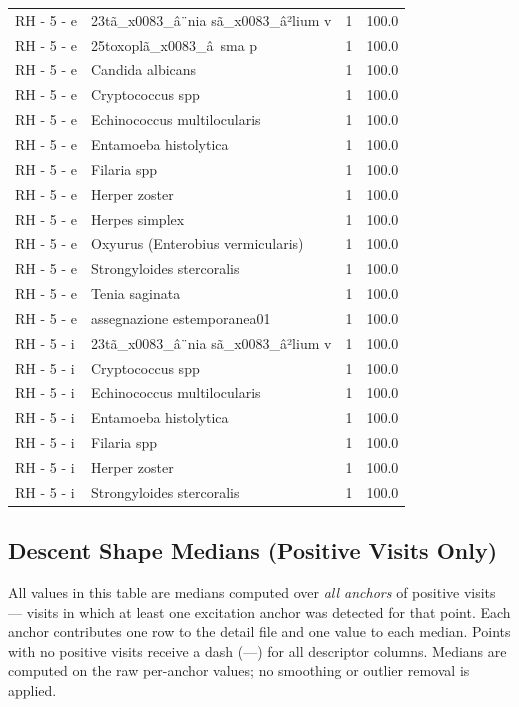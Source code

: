 \documentclass[a4paper,11pt]{article}
\begin{document}
\begin{footnotesize}
\begin{longtable}{p{3.5cm}p{7.5cm}rr}
RH - 5 - e & 23tã\_x0083\_â¨nia sã\_x0083\_â²lium v & 1 & 100.0 \\
RH - 5 - e & 25toxoplã\_x0083\_â sma p & 1 & 100.0 \\
RH - 5 - e & Candida albicans & 1 & 100.0 \\
RH - 5 - e & Cryptococcus spp & 1 & 100.0 \\
RH - 5 - e & Echinococcus multilocularis & 1 & 100.0 \\
RH - 5 - e & Entamoeba histolytica & 1 & 100.0 \\
RH - 5 - e & Filaria spp & 1 & 100.0 \\
RH - 5 - e & Herper zoster & 1 & 100.0 \\
RH - 5 - e & Herpes simplex & 1 & 100.0 \\
RH - 5 - e & Oxyurus (Enterobius vermicularis) & 1 & 100.0 \\
RH - 5 - e & Strongyloides stercoralis & 1 & 100.0 \\
RH - 5 - e & Tenia saginata & 1 & 100.0 \\
RH - 5 - e & assegnazione estemporanea01 & 1 & 100.0 \\
RH - 5 - i & 23tã\_x0083\_â¨nia sã\_x0083\_â²lium v & 1 & 100.0 \\
RH - 5 - i & Cryptococcus spp & 1 & 100.0 \\
RH - 5 - i & Echinococcus multilocularis & 1 & 100.0 \\
RH - 5 - i & Entamoeba histolytica & 1 & 100.0 \\
RH - 5 - i & Filaria spp & 1 & 100.0 \\
RH - 5 - i & Herper zoster & 1 & 100.0 \\
RH - 5 - i & Strongyloides stercoralis & 1 & 100.0 \\
\end{longtable}
\end{footnotesize}

\subsection{Descent Shape Medians (Positive Visits Only)}

All values in this table are medians computed over \emph{all anchors} of positive visits ---
visits in which at least one excitation anchor was detected for that point. Each anchor
contributes one row to the detail file and one value to each median. Points with no positive
visits receive a dash (---) for all descriptor columns.
Medians are computed on the raw per-anchor values; no smoothing or outlier removal is
applied.
\end{document}
